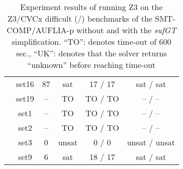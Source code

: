 \begin{table}[htbp]
\begin{minipage}{0.60\textwidth}
{\begin{tabular}[c]{c c!{\vrule width 1.5pt}c|c!{\vrule width 1.5pt}c|c|}
 			& set16    						      & 87   & sat     & 17 / 17   & sat   / sat     \\
 			& set19    						      & --   & TO      & TO / TO   & --    / --      \\
 			& set1    					              & --   & TO      & TO / TO   & --    / --      \\
 			& set2    						      & --   & TO      & TO / TO   & --    / --      \\
 			& set3    						      & 0    & unsat   & 0  / 0    & unsat / unsat   \\
 			& set9    						      & 6    & sat     & 18 / 17   & sat   / sat     \\
\hline                                                                                                                                                                                            
\end{tabular}
} \end{minipage}
\caption{Experiment results of running Z3 on the Z3/CVCx difficult (/) benchmarks of the SMT-COMP/AUFLIA-p without and with the \emph{sufGT} simplification. ``TO'': denotes time-out of 600 sec., ``UK'': denotes that the solver returns ``unknown'' before reaching time-out}
\end{table}

